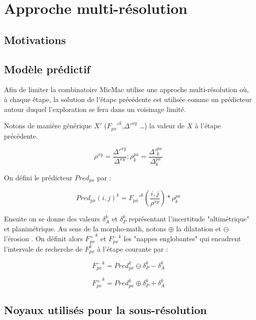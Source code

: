
\chapter{Approche multi-r\'esolution}

\label{CHAP:Multi:Resol}

\section{Motivations}



\section{Mod\`ele pr\'edictif}


\label{Appr:Multi:Resol}

Afin de limiter la combinatoire MicMac utilise une approche 
multi-r\'esolution o\`u, \`a chaque \'etape, la solution de
l'\'etape pr\'ec\'edente est utilis\'ee comme un pr\'edicteur
autour duquel l'exploration se fera dans un voisinage limit\'e.

Notons de mani\`ere g\'en\'erique $X'$ ($F_{px}'^k$,$\Delta'^{xy}$ \dots) 
la valeur de $X$ \`a l'\'etape pr\'ec\'edente. 


\begin{equation}
   \rho ^{xy} = \frac{\Delta'^{xy}}{\Delta^{xy}} ;
   \rho ^{px}_k = \frac{\Delta'^{px}_k}{\Delta^{px}_k}
\end{equation}

On d\'efini le pr\'edicteur $Pred_{px}$ par :

\begin{equation}
   Pred_{px}(i,j)^k = F_{px}'^k(\frac{i,j}{\rho^{xy}}) * \rho^{px}_k
\end{equation}

Ensuite on se donne des valeurs $\delta_{A}^k$ et  $\delta_{P}^k$ 
repr\'esentant l'incertitude "altim\'etrique" et planim\'etrique.
Au sens de la morpho-math, notons $\oplus$ la dilatation et $\ominus$ l'\'erosion .
On d\'efinit alors ${F^+_{px}}^k$ et ${F^-_{px}}^k$ 
les "nappes englobantes" qui encadrent l'intervale de
recherche de $ F_{px}^k$ \`a l'\'etape courante par :


\begin{equation}
   {F^-_{px}}^k =  Pred_{px}^k \ominus \delta_{P}^k - \delta_{A}^k
\end{equation}

\begin{equation}
   {F^+_{px}}^k =  Pred_{px}^k \oplus \delta_{P}^k + \delta_{A}^k
\end{equation}

\section{Noyaux utilis\'es pour la sous-r\'esolution}


